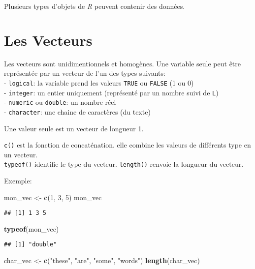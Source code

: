 \documentclass[]{book}
\newenvironment{Shaded}{\begin{snugshade}}{\end{snugshade}}
\newcommand{\DecValTok}[1]{\textcolor[rgb]{0.00,0.00,0.81}{#1}}
\newcommand{\KeywordTok}[1]{\textcolor[rgb]{0.13,0.29,0.53}{\textbf{#1}}}
\newcommand{\NormalTok}[1]{#1}
\newcommand{\StringTok}[1]{\textcolor[rgb]{0.31,0.60,0.02}{#1}}
\begin{document}
Plusieurs types d'objets de \emph{R} peuvent contenir des données.

\hypertarget{les-vecteurs}{%
\section{Les Vecteurs}\label{les-vecteurs}}

Les vecteurs sont unidimentionnels et homogènes.
Une variable seule peut être représentée par un vecteur de l'un des types suivants:\\
- \texttt{logical}: la variable prend les valeurs \texttt{TRUE} ou \texttt{FALSE} (1 ou 0)\\
- \texttt{integer}: un entier uniquement (représenté par un nombre suivi de \texttt{L})\\
- \texttt{numeric} ou \texttt{double}: un nombre réel\\
- \texttt{character}: une chaine de caractères (du texte)

Une valeur seule est un vecteur de longueur 1.

\texttt{c()} est la fonction de concaténation. elle combine les valeurs de différents type en un vecteur.\\
\texttt{typeof()} identifie le type du vecteur. \texttt{length()} renvoie la longueur du vecteur.

Exemple:

\begin{Shaded}
\begin{Highlighting}[]
\NormalTok{mon_vec <-}\StringTok{ }\KeywordTok{c}\NormalTok{(}\DecValTok{1}\NormalTok{, }\DecValTok{3}\NormalTok{, }\DecValTok{5}\NormalTok{)}
\NormalTok{mon_vec}
\end{Highlighting}
\end{Shaded}

\begin{verbatim}
## [1] 1 3 5
\end{verbatim}

\begin{Shaded}
\begin{Highlighting}[]
\KeywordTok{typeof}\NormalTok{(mon_vec)}
\end{Highlighting}
\end{Shaded}

\begin{verbatim}
## [1] "double"
\end{verbatim}

\begin{Shaded}
\begin{Highlighting}[]
\NormalTok{char_vec <-}\StringTok{ }\KeywordTok{c}\NormalTok{(}\StringTok{"these"}\NormalTok{, }\StringTok{"are"}\NormalTok{, }\StringTok{"some"}\NormalTok{, }\StringTok{"words"}\NormalTok{)}
\KeywordTok{length}\NormalTok{(char_vec)}
\end{Highlighting}
\end{Shaded}
\end{document}

